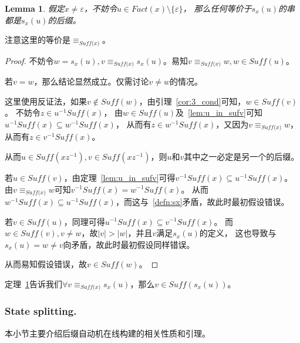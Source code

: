 \documentclass[UTF8]{ctexart}
\newtheorem{lem}[thm]{Lemma}
\theoremstyle{definition}
\theoremstyle{remark}
\numberwithin{equation}{subsection}
\newcommand{\equsuf}[1][x]{\equiv_{\textit{Suff(#1)}}}
\newcommand{\Suff}{\textit{Suff}}
\begin{document}
	\begin{lem}
	\label{lem:suf_sxu}
		假定$x \neq \varepsilon$，不妨令$u \in Fact(x) \setminus \{\varepsilon\}$，
		那么任何等价于$s_x(u)$的串都是$s_x(u)$的后缀。
	\end{lem}
	注意这里的等价是$\equsuf$。
	\begin{proof}
		不妨令$w = s_x(u), v \equsuf s_x(u)$。易知$v \equsuf w, w \in \Suff(u)$。
		
		若$v = w$，那么结论显然成立。仅需讨论$v \neq w$的情况。
		
		这里使用反证法，如果$v \notin \Suff(w)$，由引理~\ref{cor:3_cond}可知，$w \in \Suff(v)$。
		不妨令$z \in u^{-1} \Suff(x)$，
		由$w \in Suff(u)$及~\ref{lem:u_in_sufv}可知$u^{-1} \Suff(x) \subseteq w^{-1} \Suff(x)$，
		从而有$z \in w^{-1} \Suff(x)$，又因为$v \equsuf w$，从而有$z \in v^{-1} \Suff(x)$。
		
		从而$u \in \Suff(xz^{-1}), v \in \Suff(xz^{-1})$，则$u$和$v$其中之一必定是另一个的后缀。
		
		若$u \in \Suff(v)$，由定理~\ref{lem:u_in_sufv}可得$v^{-1} \Suff(x) \subseteq u^{-1} \Suff(x)$。
		由$v \equsuf w$可知$v^{-1} \Suff(x) = w^{-1} \Suff(x)$。
		从而$w^{-1} \Suff(x) \subseteq u^{-1} \Suff(x)$，而这与~\ref{defn:sx}矛盾，故此时最初假设错误。
		
		若$v \in \Suff(u)$，同理可得$u^{-1} \Suff(x) \subseteq v^{-1} \Suff(x)$。
		而$w \in \Suff(v), v \neq w$，故$|v| > |w|$，并且$v$满足$s_x(u)$的定义，
		这也导致与$s_x(u) = w \neq v$向矛盾，故此时最初假设同样错误。
		
		从而易知假设错误，故$v \in \Suff(w)$。
	\end{proof}
	定理~\ref{lem:suf_sxu}告诉我们$\forall v \equsuf s_x(u)$，那么$v \in \Suff(s_x(u))$。
	
\subsubsection{State splitting.}
	本小节主要介绍后缀自动机在线构建的相关性质和引理。
	
\end{document}
